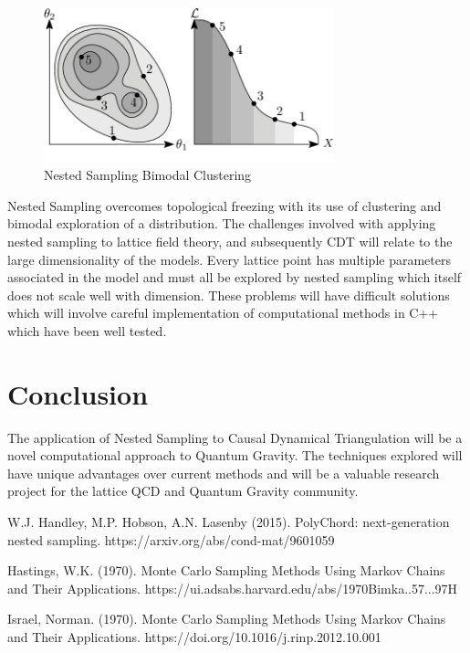 \documentclass[a4paper]{article}
\begin{document}
\begin{figure}[H]
\centering
\includegraphics[width=0.75\textwidth]{ns}
\caption{Nested Sampling Bimodal Clustering}
\end{figure}

Nested Sampling overcomes topological freezing with its use of clustering and bimodal exploration of a distribution. The challenges involved with applying nested sampling to lattice field theory, and subsequently CDT will relate to the large dimensionality of the models. Every lattice point has multiple parameters associated in the model and must all be explored by nested sampling which itself does not scale well with dimension. These problems will have difficult solutions which will involve careful implementation of computational methods in C++ which have been well tested.

\section{Conclusion}
The application of Nested Sampling to Causal Dynamical Triangulation will be a novel computational approach to Quantum Gravity. The techniques explored will have unique advantages over current methods and will be a valuable research project for the lattice QCD and Quantum Gravity community.


\newpage
\begin{thebibliography}{9}
W.J. Handley, M.P. Hobson, A.N. Lasenby (2015). PolyChord: next-generation nested sampling. https://arxiv.org/abs/cond-mat/9601059

Hastings, W.K. (1970). Monte Carlo Sampling Methods Using Markov Chains and Their Applications. https://ui.adsabs.harvard.edu/abs/1970Bimka..57...97H

Israel, Norman. (1970). Monte Carlo Sampling Methods Using Markov Chains and Their Applications. https://doi.org/10.1016/j.rinp.2012.10.001
\end{thebibliography}
\end{document}
